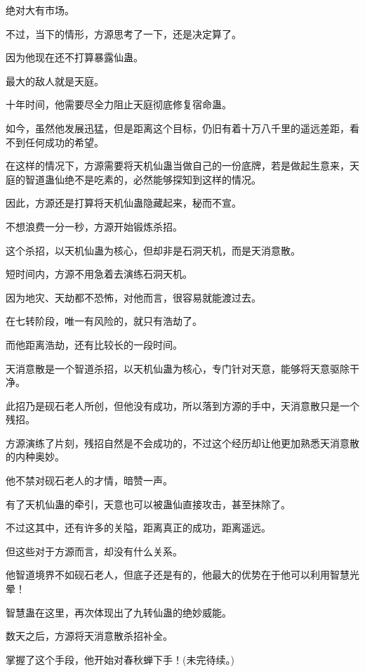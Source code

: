 \begin{this_body}
绝对大有市场。

不过，当下的情形，方源思考了一下，还是决定算了。

因为他现在还不打算暴露仙蛊。

最大的敌人就是天庭。

十年时间，他需要尽全力阻止天庭彻底修复宿命蛊。

如今，虽然他发展迅猛，但是距离这个目标，仍旧有着十万八千里的遥远差距，看不到任何成功的希望。

在这样的情况下，方源需要将天机仙蛊当做自己的一份底牌，若是做起生意来，天庭的智道蛊仙绝不是吃素的，必然能够探知到这样的情况。

因此，方源还是打算将天机仙蛊隐藏起来，秘而不宣。

不想浪费一分一秒，方源开始锻炼杀招。

这个杀招，以天机仙蛊为核心，但却非是石洞天机，而是天消意散。

短时间内，方源不用急着去演练石洞天机。

因为地灾、天劫都不恐怖，对他而言，很容易就能渡过去。

在七转阶段，唯一有风险的，就只有浩劫了。

而他距离浩劫，还有比较长的一段时间。

天消意散是一个智道杀招，以天机仙蛊为核心，专门针对天意，能够将天意驱除干净。

此招乃是砚石老人所创，但他没有成功，所以落到方源的手中，天消意散只是一个残招。

方源演练了片刻，残招自然是不会成功的，不过这个经历却让他更加熟悉天消意散的内种奥妙。

他不禁对砚石老人的才情，暗赞一声。

有了天机仙蛊的牵引，天意也可以被蛊仙直接攻击，甚至抹除了。

不过这其中，还有许多的关隘，距离真正的成功，距离遥远。

但这些对于方源而言，却没有什么关系。

他智道境界不如砚石老人，但底子还是有的，他最大的优势在于他可以利用智慧光晕！

智慧蛊在这里，再次体现出了九转仙蛊的绝妙威能。

数天之后，方源将天消意散杀招补全。

掌握了这个手段，他开始对春秋蝉下手！(未完待续。)

\end{this_body}

